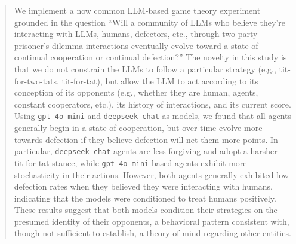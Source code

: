 \documentclass[%
 reprint,
 amsmath,amssymb,
 aps,
]{revtex4-2}
\begin{document}
\date{September 27, 2025}%
\begin{abstract}
We implement a now common LLM-based game theory experiment grounded in the question ``Will a community of LLMs who believe they're interacting with LLMs, humans, defectors, etc., through two-party prisoner’s dilemma interactions eventually evolve toward a state of continual cooperation or continual defection?'' The novelty in this study is that we do not constrain the LLMs to follow a particular strategy (e.g., tit-for-two-tats, tit-for-tat), but allow the LLM to act according to its conception of its opponents (e.g., whether they are human, agents, constant cooperators, etc.), its history of interactions, and its current score. Using \texttt{gpt-4o-mini} and \texttt{deepseek-chat} as models, we found that all agents generally begin in a state of cooperation, but over time evolve more towards defection if they believe defection will net them more points. In particular, \texttt{deepseek-chat} agents are less forgiving and adopt a harsher tit-for-tat stance, while \texttt{gpt-4o-mini} based agents exhibit more stochasticity in their actions. However, both agents generally exhibited low defection rates when they believed they were interacting with humans, indicating that the models were conditioned to treat humans positively. These results suggest that both models condition their strategies on the presumed identity of their opponents, a behavioral pattern consistent with, though not sufficient to establish, a theory of mind regarding other entities. 

\end{abstract}

\maketitle

\end{document}
